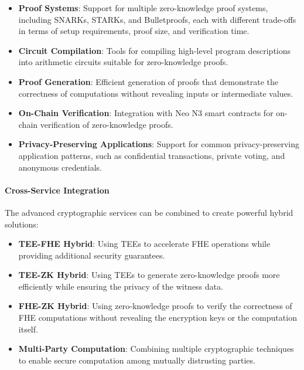 \documentclass{article}
\begin{document}
\begin{itemize}
    \item \textbf{Proof Systems}: Support for multiple zero-knowledge proof systems, including SNARKs, STARKs, and Bulletproofs, each with different trade-offs in terms of setup requirements, proof size, and verification time.
    
    \item \textbf{Circuit Compilation}: Tools for compiling high-level program descriptions into arithmetic circuits suitable for zero-knowledge proofs.
    
    \item \textbf{Proof Generation}: Efficient generation of proofs that demonstrate the correctness of computations without revealing inputs or intermediate values.
    
    \item \textbf{On-Chain Verification}: Integration with Neo N3 smart contracts for on-chain verification of zero-knowledge proofs.
    
    \item \textbf{Privacy-Preserving Applications}: Support for common privacy-preserving application patterns, such as confidential transactions, private voting, and anonymous credentials.
\end{itemize}

\paragraph{Cross-Service Integration}
The advanced cryptographic services can be combined to create powerful hybrid solutions:

\begin{itemize}
    \item \textbf{TEE-FHE Hybrid}: Using TEEs to accelerate FHE operations while providing additional security guarantees.
    
    \item \textbf{TEE-ZK Hybrid}: Using TEEs to generate zero-knowledge proofs more efficiently while ensuring the privacy of the witness data.
    
    \item \textbf{FHE-ZK Hybrid}: Using zero-knowledge proofs to verify the correctness of FHE computations without revealing the encryption keys or the computation itself.
    
    \item \textbf{Multi-Party Computation}: Combining multiple cryptographic techniques to enable secure computation among mutually distrusting parties.
\end{itemize}
\end{document}
